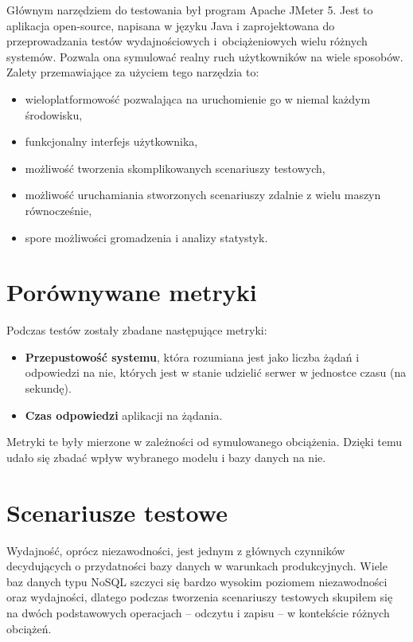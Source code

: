 Głównym narzędziem do testowania był program Apache JMeter 5.
Jest to aplikacja open-source, napisana w języku Java i zaprojektowana do przeprowadzania testów wydajnościowych i~obciążeniowych wielu różnych systemów.
Pozwala ona symulować realny ruch użytkowników na wiele sposobów.
Zalety przemawiające za użyciem tego narzędzia to:
\begin{itemize}
    \item wieloplatformowość pozwalająca na uruchomienie go w niemal każdym środowisku,
    \item funkcjonalny interfejs użytkownika,
    \item możliwość tworzenia skomplikowanych scenariuszy testowych,
    \item możliwość uruchamiania stworzonych scenariuszy zdalnie z wielu maszyn równocześnie,
    \item spore możliwości gromadzenia i analizy statystyk.
\end{itemize}

\section{Porównywane metryki}


Podczas testów zostały zbadane następujące metryki:
\begin{itemize}
    \item \textbf{Przepustowość systemu}, która rozumiana jest jako liczba żądań i odpowiedzi na nie, których jest w stanie udzielić serwer w jednostce czasu (na sekundę).
    \item \textbf{Czas odpowiedzi} aplikacji na żądania.
\end{itemize}

Metryki te były mierzone w zależności od symulowanego obciążenia.
Dzięki temu udało się zbadać wpływ wybranego modelu i bazy danych na nie.

\section{Scenariusze testowe}

Wydajność, oprócz niezawodności, jest jednym z głównych czynników decydujących o przydatności bazy danych w warunkach produkcyjnych. 
Wiele baz danych typu NoSQL szczyci się bardzo wysokim poziomem niezawodności oraz wydajności, dlatego podczas tworzenia scenariuszy testowych skupiłem się na dwóch podstawowych operacjach -- odczytu i zapisu -- w kontekście różnych obciążeń.

